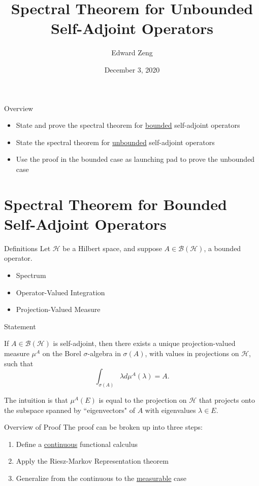 \documentclass{beamer}
\title[Spectral Theorem]{Spectral Theorem for Unbounded Self-Adjoint Operators}
\author[E. Zeng]{Edward Zeng}
\institute[UC Berkeley]{University of California, Berkeley \protect\\ DRP}
\date{December 3, 2020}
\theoremstyle{plain}
\theoremstyle{definition}
\renewcommand{\l}{\lambda}
\newcommand{\s}{\sigma}
\newcommand{\cB}{{\mathcal B}}
\newcommand{\cH}{{\mathcal H}}
\begin{document}
\maketitle

\begin{frame}{Overview}
\begin{itemize}
    \item State and prove the spectral theorem for \underline{bounded} self-adjoint operators
    \item State the spectral theorem for \underline{unbounded} self-adjoint operators
    \item Use the proof in the bounded case as launching pad to prove the unbounded case
\end{itemize}
\end{frame}

\section*{Spectral Theorem for Bounded Self-Adjoint Operators}

\begin{frame}{Definitions}
Let $\cH$ be a Hilbert space, and suppose $A \in \cB(\cH)$, a bounded operator.
    \begin{itemize}
        \item Spectrum
        \item Operator-Valued Integration
        \item Projection-Valued Measure
    \end{itemize}
\end{frame}

\begin{frame}{Statement}
    \begin{theorem}
        If $A \in \cB(\cH)$ is self-adjoint, then there exists a unique projection-valued measure $\mu^A$ on the Borel $\s$-algebra in $\s(A)$, with values in projections on $\cH$, such that
        \[
            \int_{\s(A)} \l d\mu^A(\l) = A.
        \]
    \end{theorem}
    \medskip
    The intuition is that $\mu^A(E)$ is equal to the projection on $\cH$ that projects onto the subspace spanned by ``eigenvectors" of $A$ with eigenvalues $\l \in E$.
\end{frame}

\begin{frame}{Overview of Proof}
    The proof can be broken up into three steps:
    \begin{enumerate}
        \item Define a \underline{continuous} functional calculus
        \item Apply the Riesz-Markov Representation theorem
        \item Generalize from the continuous to the \underline{measurable} case
    \end{enumerate}
\end{frame}
\end{document}
